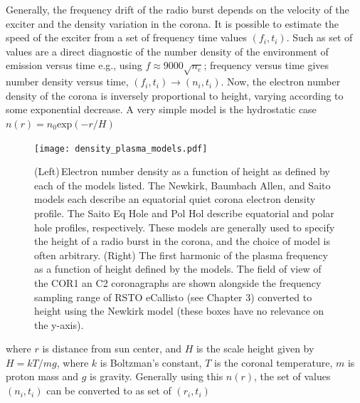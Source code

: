 Generally, the frequency drift of the radio burst depends on the velocity of the exciter and the density variation in the corona. 
It is possible to estimate the speed of the exciter from a set of frequency time values $(f_i, t_i)$. Such as set of values are a direct diagnostic of the number density of the environment of emission versus time e.g., using $f \approx 9000\sqrt{n_e}$; frequency versus time gives number density versus time, $(f_i, t_i) \rightarrow (n_i,t_i)$.
Now, the electron number density of the corona is inversely proportional to height, varying according to some exponential decrease. A very simple model is the hydrostatic case $n(r) = n_0\mathrm{exp}(-r/H)$
\begin{figure}[t!]
\begin{center}
\texttt{[image: density\_plasma\_models.pdf]}
\caption[Various models for electron number density in the corona]{(Left)\,Electron number density as a function of height as defined by each of the models listed. The Newkirk, Baumbach Allen, and Saito models each describe an equatorial quiet corona electron density profile. The Saito Eq Hole and Pol Hol describe equatorial and polar hole profiles, respectively. These models are generally used to specify the height of a radio burst in the corona, and the choice of model is often arbitrary. (Right) The first harmonic of the plasma frequency as a function of height defined by the models. The field of view of the COR1 an C2 coronagraphs are shown alongside the frequency sampling range of RSTO eCallisto (see Chapter 3) converted to height using the Newkirk model (these boxes have no relevance on the y-axis).}%
\label{fig:frequency_model}
\end{center}
\end{figure}
where $r$ is distance from sun center, and $H$ is the scale height given by $H = kT/mg$, where $k$ is Boltzman's constant, $T$ is the coronal temperature, $m$ is proton mass and $g$ is gravity. Generally using this $n(r)$, the set of values $(n_i,t_i)$ can be converted to as set of $(r_i,t_i)$
